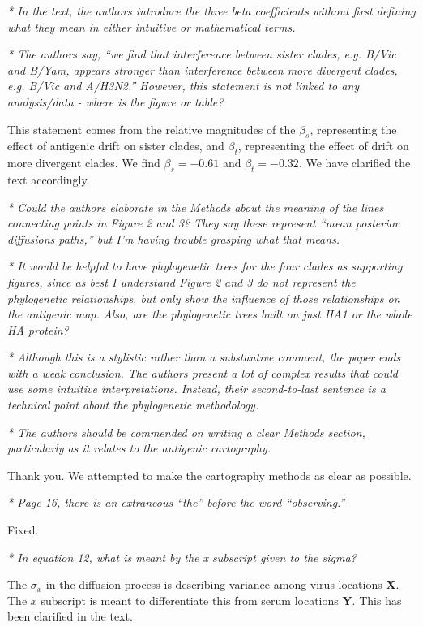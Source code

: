 \documentclass[11pt,oneside,letterpaper]{article}
\begin{document}
\textsl{* In the text, the authors introduce the three beta coefficients without first defining what they mean in either intuitive or mathematical terms.}

\textsl{* The authors say, ``we find that interference between sister clades, e.g. B/Vic and B/Yam, appears stronger than interference between more divergent clades, e.g. B/Vic and A/H3N2.'' However, this statement is not linked to any analysis/data - where is the figure or table?}

This statement comes from the relative magnitudes of the $\beta_s$, representing the effect of antigenic drift on sister clades, and $\beta_t$, representing the effect of drift on more divergent clades.  We find $\beta_s = -0.61$ and $\beta_t = -0.32$.  We have clarified the text accordingly.

\textsl{* Could the authors elaborate in the Methods about the meaning of the lines connecting points in Figure 2 and 3? They say these represent ``mean posterior diffusions paths,'' but I'm having trouble grasping what that means.}

\textsl{* It would be helpful to have phylogenetic trees for the four clades as supporting figures, since as best I understand Figure 2 and 3 do not represent the phylogenetic relationships, but only show the influence of those relationships on the antigenic map. Also, are the phylogenetic trees built on just HA1 or the whole HA protein?}

\textsl{* Although this is a stylistic rather than a substantive comment, the paper ends with a weak conclusion. The authors present a lot of complex results that could use some intuitive interpretations. Instead, their second-to-last sentence is a technical point about the phylogenetic methodology.}

\textsl{* The authors should be commended on writing a clear Methods section, particularly as it relates to the antigenic cartography.}

Thank you. We attempted to make the cartography methods as clear as possible.

\textsl{* Page 16, there is an extraneous ``the'' before the word ``observing.''}

Fixed.

\textsl{* In equation 12, what is meant by the x subscript given to the sigma?}

The $\sigma_x$ in the diffusion process is describing variance among virus locations $\mathbf{X}$.  The $x$ subscript is meant to differentiate this from serum locations $\mathbf{Y}$.  This has been clarified in the text.
\end{document}
